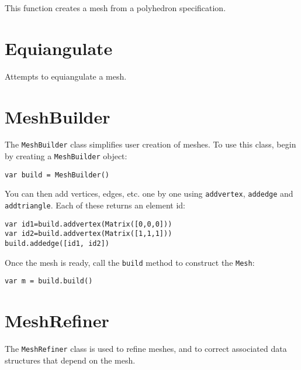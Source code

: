 This function creates a mesh from a polyhedron specification.

\hypertarget{equiangulate}{%
\section{Equiangulate}\label{equiangulate}}

Attempts to equiangulate a mesh.

\hypertarget{meshbuilder}{%
\section{MeshBuilder}\label{meshbuilder}}

The \texttt{MeshBuilder} class simplifies user creation of meshes. To
use this class, begin by creating a \texttt{MeshBuilder} object:

\begin{lstlisting}
var build = MeshBuilder()
\end{lstlisting}

You can then add vertices, edges, etc. one by one using
\texttt{addvertex}, \texttt{addedge} and \texttt{addtriangle}. Each of
these returns an element id:

\begin{lstlisting}
var id1=build.addvertex(Matrix([0,0,0]))
var id2=build.addvertex(Matrix([1,1,1]))
build.addedge([id1, id2])
\end{lstlisting}

Once the mesh is ready, call the \texttt{build} method to construct the
\texttt{Mesh}:

\begin{lstlisting}
var m = build.build()
\end{lstlisting}

\hypertarget{meshrefiner}{%
\section{MeshRefiner}\label{meshrefiner}}

The \texttt{MeshRefiner} class is used to refine meshes, and to correct
associated data structures that depend on the mesh.
